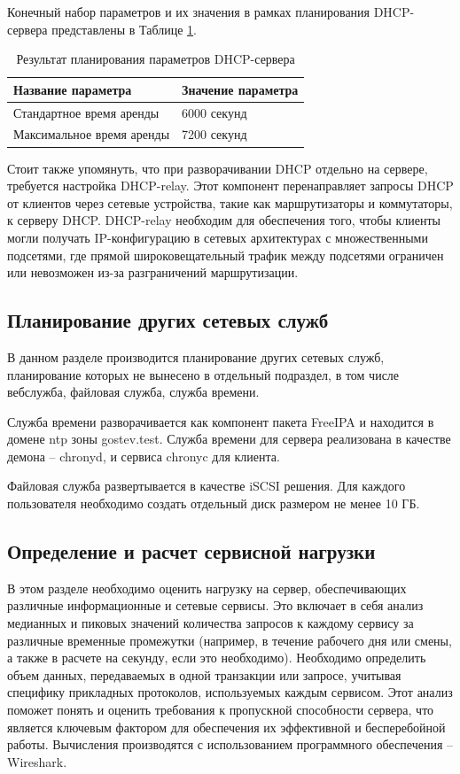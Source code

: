 \documentclass[14pt, a4paper]{extarticle}
\numberwithin{equation}{section}
\begin{document}
Конечный набор параметров и их значения в рамках планирования
DHCP-сервера представлены в Таблице \ref{table:dhcp_plan_parameters}.

\begin{table}[H]
\centering
\small
\caption{Результат планирования параметров DHCP-сервера}
\label{table:dhcp_plan_parameters}
\begin{tabular}{|l|l|}
\hline
\textbf{Название параметра} & \textbf{Значение параметра} \\
\hline
Стандартное время аренды & 6000 секунд \\
\hline
Максимальное время аренды & 7200 секунд \\
\hline
\end{tabular}
\end{table}

Стоит также упомянуть, что при разворачивании DHCP отдельно на сервере, требуется настройка DHCP-relay. 
Этот компонент перенаправляет запросы DHCP от клиентов через сетевые устройства, 
такие как маршрутизаторы и коммутаторы, к серверу DHCP. DHCP-relay необходим для 
обеспечения того, чтобы клиенты могли получать IP-конфигурацию в сетевых 
архитектурах с множественными подсетями, где прямой широковещательный трафик между 
подсетями ограничен или невозможен из-за разграничений маршрутизации.





\subsection{Планирование других сетевых служб}
В данном разделе производится планирование других сетевых служб, 
планирование которых не вынесено в отдельный подраздел, в 
том числе вебслужба, файловая служба, служба времени. 

Служба времени разворачивается как компонент пакета FreeIPA и находится в домене
ntp зоны gostev.test. Служба времени для сервера реализована в качестве демона -- chronyd, и
сервиса chronyc для клиента.

Файловая служба развертывается в качестве iSCSI решения. Для каждого пользователя необходимо
создать отдельный диск размером не менее 10 ГБ.


\subsection{Определение и расчет сервисной нагрузки}
В этом разделе необходимо оценить нагрузку на сервер, обеспечивающих различные информационные и сетевые сервисы. 
Это включает в себя анализ медианных и пиковых значений количества запросов к каждому сервису за различные временные промежутки 
(например, в течение рабочего дня или смены, а также в расчете на секунду, если это необходимо). 
Необходимо определить объем данных, передаваемых в одной транзакции или запросе, 
учитывая специфику прикладных протоколов, используемых каждым сервисом. 
Этот анализ поможет понять и оценить требования к пропускной способности сервера, 
что является ключевым фактором для обеспечения их эффективной и бесперебойной работы.
Вычисления производятся с использованием программного обеспечения -- Wireshark.
\end{document}
